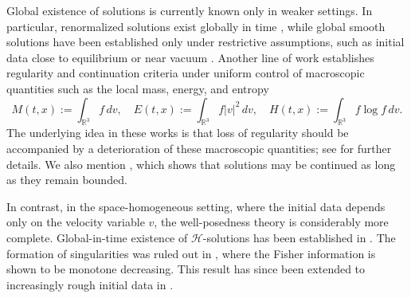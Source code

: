 \documentclass[10pt,oneside]{amsart}
\numberwithin{equation}{section}
\numberwithin{definition}{section}
\numberwithin{theorem}{section}
\numberwithin{lemma}{section}
\begin{document}
Global existence of solutions is currently known only in weaker settings. In particular, renormalized solutions exist globally in time \cite{Lions1994RenormSolLandauBoltzman}, while global smooth solutions have been established only under restrictive assumptions, such as initial data close to equilibrium \cite{Guo2002LandauPeriodicBox,CarraKeblerTristWu2016ExpStabLandau,CarraMisch2017LandauNearMaxw,DuanLiu2021GlobalMildLandau,KimGuo2020L2LinftyLandau,GuoHwangJinOuy2020LandauSpecular,chenNguYang2025LandauBoltzCriticalSpaces} or near vacuum \cite{Luk2019LandauVacuum,chaturvedi2023LandauVacuum}. Another line of work establishes regularity and continuation criteria under uniform control of macroscopic quantities such as the local mass, energy, and entropy
%
\begin{equation*}
  M(t,x):= \int_{\mathbb R^3}f\,dv,\quad 
  E(t,x):= \int_{\mathbb R^3}f|v|^2\,dv,\quad
  H(t,x):= \int_{\mathbb R^3}f\log f\,dv.
\end{equation*}
%
The underlying idea in these works is that loss of regularity should be accompanied by a deterioration of these macroscopic quantities; see \cite{MouhotVasseur2019HarnackLandau,henderson2020Cinfty_smoothing,snelson2023continuationLandau,silvestreSnelson2018aPrioriLandau} for further details. We also mention \cite{golding2025hydrodynamicimplosionslandaucoulombequation}, which shows that solutions may be continued as long as they remain bounded. 

In contrast, in the space-homogeneous setting, where the initial data depends only on the velocity variable $v$, the well-posedness theory is considerably more complete. Global-in-time existence of $\mathcal H$-solutions has been established in \cite{Villani1998LandauHsolutions,desvill_villani2000landau_hard,AlexLiaoLin2015APrioriLandauSoft,wu2014GlobalEstimLandau,fournier2009well_posedness_soft_potentials}. The formation of singularities was ruled out in \cite{GS24}, where the Fisher information is shown to be monotone decreasing. This result has since been extended to increasingly rough initial data in \cite{GualdaGoldLohDev2024LandauFisherL1,Ji2024LandauDissFisher,GualdGoldLoher2025LandauL32,HeJiLuo2025LandauH-12}.
\end{document}
